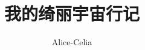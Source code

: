 \documentclass[UTF8]{ctexbook}
\title{\Huge 我的绮丽宇宙行记}
\author{Alice-Celia}
\date{\zhtoday}
\begin{document}
\maketitle


\iffalse %

\section*{2023 二月}






\section*{2023 七月}



\section*{2023 八月}




\fi %


\end{document}
